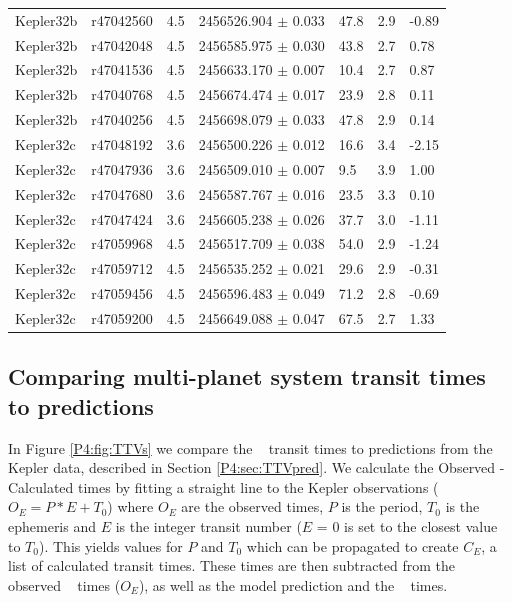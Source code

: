 {\begin{longtable}[h]{lllllll}
Kepler32b &  r47042560 &     4.5 & 2456526.904 $\pm$ 0.033 &      47.8 & 2.9 & -0.89 \\
Kepler32b &  r47042048 &     4.5 & 2456585.975 $\pm$ 0.030 &      43.8 & 2.7 &  0.78 \\
Kepler32b &  r47041536 &     4.5 & 2456633.170 $\pm$ 0.007 &      10.4 & 2.7 &  0.87 \\
Kepler32b &  r47040768 &     4.5 & 2456674.474 $\pm$ 0.017 &      23.9 & 2.8 &  0.11 \\
Kepler32b &  r47040256 &     4.5 & 2456698.079 $\pm$ 0.033 &      47.8 & 2.9 &  0.14 \\
Kepler32c &  r47048192 &     3.6 & 2456500.226 $\pm$ 0.012 &      16.6 & 3.4 & -2.15 \\
Kepler32c &  r47047936 &     3.6 & 2456509.010 $\pm$ 0.007 &       9.5 & 3.9 &  1.00 \\
Kepler32c &  r47047680 &     3.6 & 2456587.767 $\pm$ 0.016 &      23.5 & 3.3 &  0.10 \\
Kepler32c &  r47047424 &     3.6 & 2456605.238 $\pm$ 0.026 &      37.7 & 3.0 & -1.11 \\
Kepler32c &  r47059968 &     4.5 & 2456517.709 $\pm$ 0.038 &      54.0 & 2.9 & -1.24 \\
Kepler32c &  r47059712 &     4.5 & 2456535.252 $\pm$ 0.021 &      29.6 & 2.9 & -0.31 \\
Kepler32c &  r47059456 &     4.5 & 2456596.483 $\pm$ 0.049 &      71.2 & 2.8 & -0.69 \\
Kepler32c &  r47059200 &     4.5 & 2456649.088 $\pm$ 0.047 &      67.5 & 2.7 &  1.33 \\
\end{longtable}
}


\subsection{Comparing multi-planet system transit times to predictions}
\label{P4:sec:coolcompare}

In Figure \ref{P4:fig:TTVs} we compare the \spitzer~ transit times to predictions from the Kepler data, described in Section \ref{P4:sec:TTVpred}. We calculate the Observed - Calculated times by fitting a straight line to the Kepler observations ($O_E = P*E + T_0$) where $O_E$ are the observed times, $P$ is the period, $T_0$ is the ephemeris and $E$ is the integer transit number ($E$ = 0 is set to the closest value to $T_0$). This yields values for $P$ and $T_0$ which can be propagated to create $C_E$, a list of calculated transit times. These times are then subtracted from the observed \Kepler~ times ($O_E$), as well as the model prediction and the \spitzer~ times.

